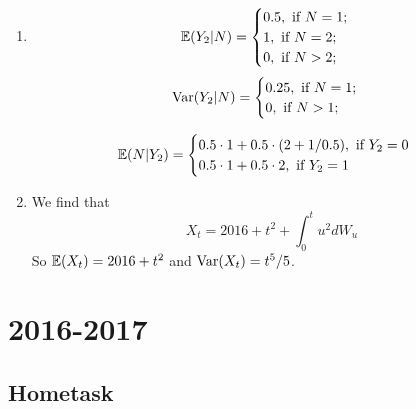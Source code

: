\documentclass[12pt, a4paper]{article}
\begin{document}
\begin{enumerate}
\item
\[
\mathbb{E}(Y_2 |N) =\begin{cases}
0.5, \text{ if } N=1; \\
1, \text{ if } N=2; \\
0, \text{ if } N>2; \\
\end{cases}
\]
\[
\operatorname{Var}(Y_2 |N) =\begin{cases}
0.25, \text{ if } N=1; \\
0, \text{ if } N>1; \\
\end{cases}
\]

\[
\mathbb{E}(N|Y_2) = \begin{cases}
0.5 \cdot 1 + 0.5\cdot (2 + 1/0.5), \text{ if } Y_2 = 0 \\
0.5 \cdot 1 + 0.5\cdot 2, \text{ if } Y_2 = 1 \\
\end{cases}
\]

\item We find that
\[
X_t = 2016 + t^2 + \int_0^t u^2 dW_u
\]
So $\mathbb{E}(X_t) = 2016 + t^2$ and $\operatorname{Var}(X_t) = t^5/5$.
\end{enumerate}


\section{2016-2017}

\subsection{Hometask}
\end{document}
